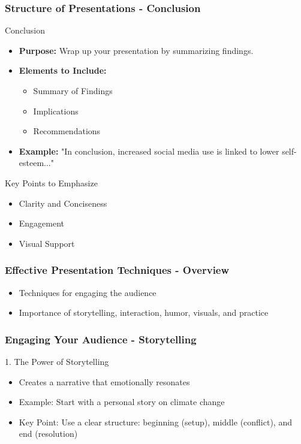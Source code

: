 \documentclass[aspectratio=169]{beamer}
\begin{document}
\begin{frame}[fragile]
    \frametitle{Structure of Presentations - Conclusion}
    \begin{block}{Conclusion}
        \begin{itemize}
            \item \textbf{Purpose:} Wrap up your presentation by summarizing findings.
            \item \textbf{Elements to Include:}
                \begin{itemize}
                    \item Summary of Findings
                    \item Implications
                    \item Recommendations
                \end{itemize}
            \item \textbf{Example:} 
                "In conclusion, increased social media use is linked to lower self-esteem..."
        \end{itemize}
    \end{block}

    \begin{block}{Key Points to Emphasize}
        \begin{itemize}
            \item Clarity and Conciseness
            \item Engagement
            \item Visual Support
        \end{itemize}
    \end{block}
\end{frame}

\begin{frame}[fragile]
    \frametitle{Effective Presentation Techniques - Overview}
    \begin{itemize}
        \item Techniques for engaging the audience
        \item Importance of storytelling, interaction, humor, visuals, and practice
    \end{itemize}
\end{frame}

\begin{frame}[fragile]
    \frametitle{Engaging Your Audience - Storytelling}
    \begin{block}{1. The Power of Storytelling}
        \begin{itemize}
            \item Creates a narrative that emotionally resonates
            \item Example: Start with a personal story on climate change
            \item Key Point: Use a clear structure: beginning (setup), middle (conflict), and end (resolution)
        \end{itemize}
    \end{block}
\end{frame}
\end{document}
